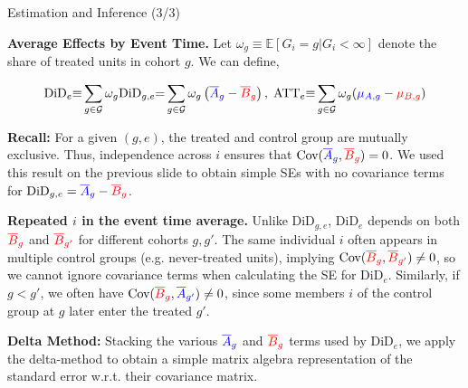 \documentclass[usenames,dvipsnames]{beamer}
\begin{document}
\begin{frame}{Estimation and Inference (3/3)}

\vspace{-0.1cm}

\textbf{Average Effects by Event Time.} Let  $\omega_g \equiv \mathbb{E}[G_i =g | G_i < \infty]$ denote the share of treated units in cohort $g$.  We can define,

\vspace{-0.5cm}

\begin{equation} \notag
\text{DiD}_e  {\equiv}  \sum_{g \in \mathcal{G}} \omega_g \text{DiD}_{g,e} {=}  \sum_{g \in \mathcal{G}} \omega_g \left(  {\color{blue}\overline{A}_g} - {\color{red}\overline{B}_g} \right), 
  \; \text{ATT}_e {\equiv} \sum_{g \in \mathcal{G}}  \omega_{g}  ( {\color{blue}\mu_{A,g}} - {\color{red}\mu_{B,g}} )
\end{equation} 

\vspace{-0.25cm}

\textbf{Recall:} For a given $(g,e)$, the treated and control group are mutually exclusive. Thus, independence across $i$ ensures that $\text{Cov}({\color{blue}\overline{A}_g}, {\color{red}\overline{B}_g})=0$. We used this result on the previous slide to obtain simple SEs with no covariance terms for $\text{DiD}_{g,e} = {\color{blue}\overline{A}_g} - {\color{red}\overline{B}_g} $.

\textbf{Repeated $i$ in the event time average.} Unlike $\text{DiD}_{g,e}$, $\text{DiD}_e$ depends on both ${\color{red}\overline{B}_g}$ and ${\color{red}\overline{B}_{g'}}$ for different cohorts $g,g'$. The same individual $i$ often appears in multiple control groups (e.g. never-treated units), implying $\text{Cov}({\color{red}\overline{B}_g}, {\color{red}\overline{B}_{g'}}) \neq 0$, so we cannot ignore covariance terms when calculating the SE for $\text{DiD}_e$. Similarly, if $g<g'$, we often have $\text{Cov}({\color{red}\overline{B}_g}, {\color{blue}\overline{A}_{g'}}) \neq 0$, since some members $i$ of the control group at $g$ later enter the treated  $g'$.

\vspace{-0.05cm}

\textbf{Delta Method:} Stacking the various ${\color{blue}\overline{A}_g}$ and ${\color{red}\overline{B}_g}$ terms used by $\text{DiD}_{e}$, we apply the delta-method to obtain a simple matrix algebra representation of the standard error w.r.t. their covariance matrix.

\end{frame}
\end{document}
